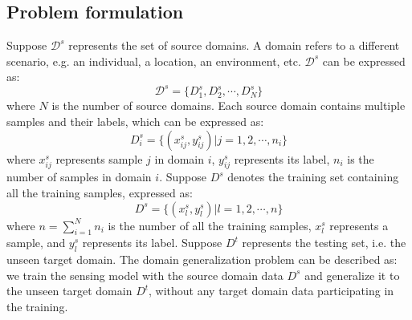 \documentclass[journal]{IEEEtran}
\begin{document}
\subsection{Problem formulation}
Suppose $\mathcal D^s$ represents the set of source domains. A domain refers to a different scenario, e.g. an individual, a location, an environment, etc. $\mathcal D^s$ can be expressed as: 
\begin{equation}
\mathcal D^s = \{ D_{1}^{s}, D_{2}^{s}, \cdots, D_{N}^{s} \}
\end{equation}
where $N$ is the number of source domains. Each source domain contains multiple samples and their labels, which can be expressed as: 
\begin{equation}
D_{i}^{s} = \{(x_{ij}^{s}, y_{ij}^{s})|j=1,2,\cdots,n_i\}
\end{equation}
where $x_{ij}^{s}$ represents sample $j$ in domain $i$, $y_{ij}^{s}$ represents its label, $n_i$ is the number of samples in domain $i$. Suppose $D^s$ denotes the training set containing all the training samples, expressed as:
\begin{equation}
D^{s} = \{(x_{l}^{s}, y_{l}^{s})|l=1,2,\cdots,n\}
\end{equation}
where $n=\sum_{i=1}^N{n_i}$ is the number of all the training samples, $x_{l}^{s}$ represents a sample, and $y_{l}^{s}$ represents its label. Suppose $D^{t}$ represents the testing set, i.e. the unseen target domain. The domain generalization problem can be described as: we train the sensing model with the source domain data $D^{s}$ and generalize it to the unseen target domain $D^{t}$, without any target domain data participating in the training. 
\end{document}
